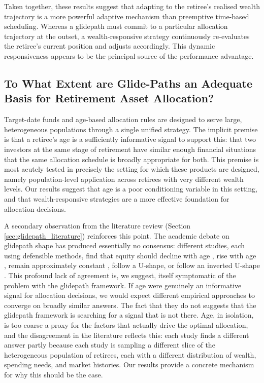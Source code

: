 \documentclass[11pt]{article}
\begin{document}
Taken together, these results suggest that adapting to the retiree's realised wealth trajectory is a more powerful adaptive mechanism than preemptive time-based scheduling. Whereas a glidepath must commit to a particular allocation trajectory at the outset, a wealth-responsive strategy continuously re-evaluates the retiree's current position and adjusts accordingly. This dynamic responsiveness appears to be the principal source of the performance advantage.

\subsection{To What Extent are Glide-Paths an Adequate Basis for Retirement Asset Allocation?}

Target-date funds and age-based allocation rules are designed to serve large, heterogeneous populations through a single unified strategy. The implicit premise is that a retiree's age is a sufficiently informative signal to support this: that two investors at the same stage of retirement have similar enough financial situations that the same allocation schedule is broadly appropriate for both. This premise is most acutely tested in precisely the setting for which these products are designed, namely population-level application across retirees with very different wealth levels. Our results suggest that age is a poor conditioning variable in this setting, and that wealth-responsive strategies are a more effective foundation for allocation decisions.

A secondary observation from the literature review (Section \ref{sec:glidepath_literature}) reinforces this point. The academic debate on glidepath shape has produced essentially no consensus: different studies, each using defensible methods, find that equity should decline with age \parencite[e.g.][]{estrada2015retirement}, rise with age \parencite[e.g.][]{pfau2014rising}, remain approximately constant \parencite[e.g.][]{anarkulova2025beyond, blanchett2007dynamic}, follow a U-shape, or follow an inverted U-shape \parencite{estrada2014glidepath}. This profound lack of agreement is, we suggest, itself symptomatic of the problem with the glidepath framework. If age were genuinely an informative signal for allocation decisions, we would expect different empirical approaches to converge on broadly similar answers. The fact that they do not suggests that the glidepath framework is searching for a signal that is not there. Age, in isolation, is too coarse a proxy for the factors that actually drive the optimal allocation, and the disagreement in the literature reflects this: each study finds a different answer partly because each study is sampling a different slice of the heterogeneous population of retirees, each with a different distribution of wealth, spending needs, and market histories. Our results provide a concrete mechanism for why this should be the case.
\end{document}
